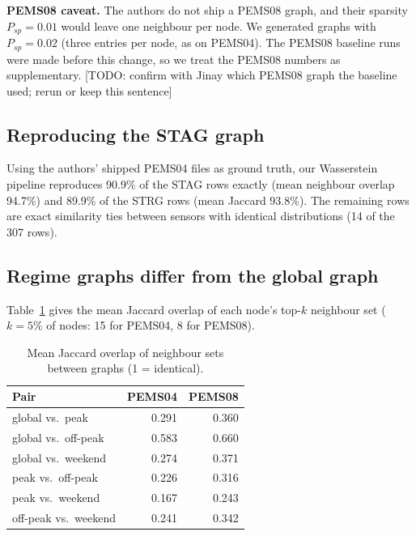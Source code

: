 \documentclass[conference]{IEEEtran}
\newcommand{\todo}[1]{{\color{red}[TODO: #1]}}
\begin{document}
\textbf{PEMS08 caveat.} The authors do not ship a PEMS08 graph, and their sparsity $P_{sp}=0.01$ would leave one neighbour per node. We generated graphs with $P_{sp}=0.02$ (three entries per node, as on PEMS04). The PEMS08 baseline runs were made before this change, so we treat the PEMS08 numbers as supplementary. \todo{confirm with Jinay which PEMS08 graph the baseline used; rerun or keep this sentence}

\subsection{Reproducing the STAG graph}
Using the authors' shipped PEMS04 files as ground truth, our Wasserstein pipeline reproduces 90.9\% of the STAG rows exactly (mean neighbour overlap 94.7\%) and 89.9\% of the STRG rows (mean Jaccard 93.8\%). The remaining rows are exact similarity ties between sensors with identical distributions (14 of the 307 rows).

\subsection{Regime graphs differ from the global graph}\label{sec:regimegraphs}
Table~\ref{tab:jacc} gives the mean Jaccard overlap of each node's top-$k$ neighbour set ($k=5\%$ of nodes: 15 for PEMS04, 8 for PEMS08).
\begin{table}[t]
\centering\caption{Mean Jaccard overlap of neighbour sets between graphs (1 = identical).}\label{tab:jacc}
\footnotesize
\begin{tabular}{@{}lrr@{}}
\toprule
Pair & PEMS04 & PEMS08\\
\midrule
global vs.\ peak & 0.291 & 0.360\\
global vs.\ off-peak & 0.583 & 0.660\\
global vs.\ weekend & 0.274 & 0.371\\
peak vs.\ off-peak & 0.226 & 0.316\\
peak vs.\ weekend & 0.167 & 0.243\\
off-peak vs.\ weekend & 0.241 & 0.342\\
\bottomrule
\end{tabular}
\end{table}
\end{document}
